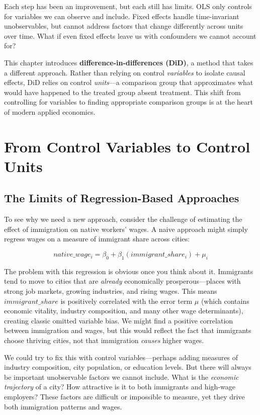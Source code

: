 \documentclass[
  letterpaper,
  DIV=11,
  numbers=noendperiod]{scrreprt}
\begin{document}
Each step has been an improvement, but each still has limits. OLS only
controls for variables we can observe and include. Fixed effects handle
time-invariant unobservables, but cannot address factors that change
differently across units over time. What if even fixed effects leave us
with confounders we cannot account for?

This chapter introduces \textbf{difference-in-differences (DiD)}, a
method that takes a different approach. Rather than relying on control
\emph{variables} to isolate causal effects, DiD relies on control
\emph{units}---a comparison group that approximates what would have
happened to the treated group absent treatment. This shift from
controlling for variables to finding appropriate comparison groups is at
the heart of modern applied economics.

\section{From Control Variables to Control
Units}\label{from-control-variables-to-control-units}

\subsection{The Limits of Regression-Based
Approaches}\label{the-limits-of-regression-based-approaches}

To see why we need a new approach, consider the challenge of estimating
the effect of immigration on native workers' wages. A naive approach
might simply regress wages on a measure of immigrant share across
cities:

\[
native\_wage_i = \beta_0 + \beta_1(immigrant\_share_i) + \mu_i
\]

The problem with this regression is obvious once you think about it.
Immigrants tend to move to cities that are \emph{already} economically
prosperous---places with strong job markets, growing industries, and
rising wages. This means \(immigrant\_share\) is positively correlated
with the error term \(\mu\) (which contains economic vitality, industry
composition, and many other wage determinants), creating classic omitted
variable bias. We might find a positive correlation between immigration
and wages, but this would reflect the fact that immigrants choose
thriving cities, not that immigration \emph{causes} higher wages.

We could try to fix this with control variables---perhaps adding
measures of industry composition, city population, or education levels.
But there will always be important unobservable factors we cannot
include. What is the \emph{economic trajectory} of a city? How
attractive is it to both immigrants and high-wage employers? These
factors are difficult or impossible to measure, yet they drive both
immigration patterns and wages.
\end{document}
